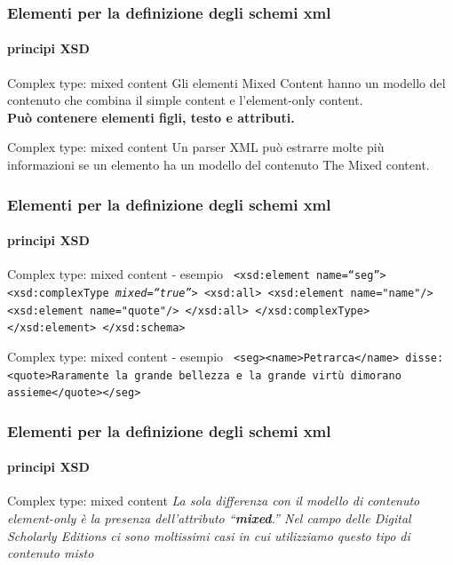 \begin{frame}
	\frametitle{Elementi per la definizione degli schemi xml}
	\framesubtitle{principi XSD}
	\addtocounter{nframe}{1}

	\begin{block}{Complex type: mixed content}
		Gli elementi Mixed Content hanno un modello del contenuto che combina il simple content e l'element-only content.
		\\ \textbf{Può contenere elementi figli, testo e attributi.}
	\end{block}

	\begin{block}{Complex type: mixed content}
		Un parser XML può estrarre molte più informazioni se un elemento ha un modello del contenuto The Mixed content.
	\end{block}
\end{frame}

\begin{frame}
	\frametitle{Elementi per la definizione degli schemi xml}
	\framesubtitle{principi XSD}
	\addtocounter{nframe}{1}

	\begin{block}{Complex type: mixed content - esempio}
		\texttt{
			<xsd:element name=``seg''>
			<xsd:complexType \textit{mixed=``true''}>
			<xsd:all>
			<xsd:element name="name"/>
			<xsd:element name="quote"/>
			</xsd:all>
			</xsd:complexType>
			</xsd:element>
			</xsd:schema>
		}
	\end{block}

	\begin{block}{Complex type: mixed content - esempio}
		\texttt{
			<seg><name>Petrarca</name> disse: <quote>Raramente la grande bellezza e la grande virtù dimorano assieme</quote></seg>
		}
	\end{block}

\end{frame}

\begin{frame}
	\frametitle{Elementi per la definizione degli schemi xml}
	\framesubtitle{principi XSD}
	\addtocounter{nframe}{1}

	\begin{block}{Complex type: mixed content}
		\textit{La sola differenza con il modello di contenuto element-only è la presenza dell'attributo ``\textbf{mixed}.'' Nel campo delle Digital Scholarly Editions ci sono moltissimi casi in cui utilizziamo questo tipo di contenuto misto}
	\end{block}


\end{frame}


